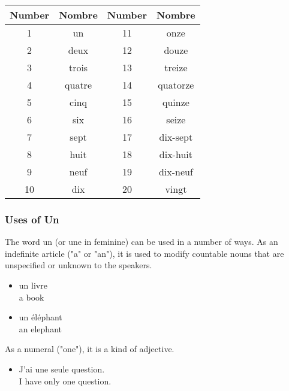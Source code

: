 \begin{center}\begin{tabular}{|c|c|c|c|}
\hline
\textbf{Number} & \textbf{Nombre} & \textbf{Number} & \textbf{Nombre} \\ \hline
1               & un              & 11              & onze            \\ \hline
2               & deux            & 12              & douze           \\ \hline
3               & trois           & 13              & treize          \\ \hline
4               & quatre          & 14              & quatorze        \\ \hline
5               & cinq            & 15              & quinze          \\ \hline
6               & six             & 16              & seize           \\ \hline
7               & sept            & 17              & dix-sept        \\ \hline
8               & huit            & 18              & dix-huit        \\ \hline
9               & neuf            & 19              & dix-neuf        \\ \hline
10              & dix             & 20              & vingt           \\ \hline
\end{tabular}\end{center}

\subsubsection{Uses of Un}

The word un (or une in feminine) can be used in a number of ways.  As an indefinite article ("a" or "an"), it is used to modify countable nouns that are unspecified or unknown to the speakers.

\begin{itemize}
  \item  un livre \\ a book
  \item  un {\'e}l{\'e}phant \\ an elephant
\end{itemize}

As a numeral ("one"), it is a kind of adjective.

\begin{itemize}
  \item  J'ai une seule question. \\ I have only one question.
\end{itemize}

